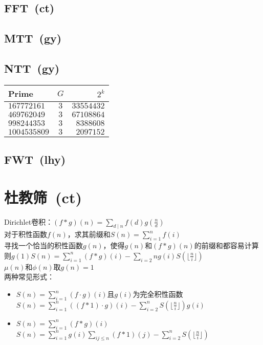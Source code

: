     \subsection*{FFT\ \small(ct)}
    \subsection*{MTT\ \small(gy)}
    \subsection*{NTT\ \small(gy)}
        \begin{tabular}{l c r}
            \hline
            Prime & $ G $ & $ 2^k $\\\hline
            $ 167772161 $ & $ 3 $ & $ 33554432 $\\\hline
            $ 469762049 $ & $ 3 $ & $ 67108864 $\\\hline
            $ 998244353 $ & $ 3 $ & $ 8388608 $\\\hline
            $ 1004535809 $ & $ 3 $ & $ 2097152 $\\\hline
        \end{tabular}
    \subsection*{FWT\ \small(lhy)}
\section{杜教筛\ \small(ct)}
    \noindent Dirichlet卷积：$ (f \ast g) (n) = \sum\limits_{d \mid n}^{} f(d) g(\frac{n}{d}) $
    \\对于积性函数$ f(n) $，求其前缀和$ S(n) = \sum\limits_{i = 1}^{n} f(i) $
    \\寻找一个恰当的积性函数$ g(n) $，使得$ g(n) $和$ (f \ast g) (n) $的前缀和都容易计算
    \\则$ g(1) S(n) = \sum\limits_{i = 1}^{n} (f \ast g) (i) - \sum\limits_{i = 2}{n} g(i) S(\lfloor \frac{n}{i} \rfloor) $
    \\$ \mu (n) $和$ \phi (n) $取$ g(n) = 1 $
    \\两种常见形式：
    \begin{itemize}[wide=0pt]
        \item $ S(n) = \sum\limits_{i = 1}^{n} (f \cdot g) (i) $且$ g(i) $为完全积性函数
            \\$ S(n) = \sum\limits_{i = 1}^{n} ((f \ast 1) \cdot g) (i) - \sum\limits_{i = 2}^{n} S(\lfloor \frac{n}{i} \rfloor) g(i) $
        \item $ S(n) = \sum\limits_{i = 1}^{n} (f \ast g) (i) $
            \\$ S(n) = \sum\limits_{i = 1}^{n} g (i) \sum\limits_{ij \leq n}^{} (f \ast 1) (j) - \sum\limits_{i = 2}^{n} S(\lfloor \frac{n}{i} \rfloor) $
    \end{itemize}
